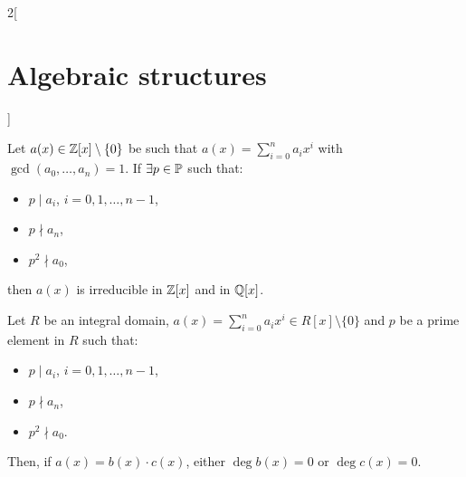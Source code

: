\documentclass[../../../main.tex]{subfiles}
\begin{document}
\begin{multicols}{2}[\section{Algebraic structures}]
\begin{theorem}
  \end{theorem}
  \begin{theorem}
    Let $a(x)\in\mathbb{Z}[x]\setminus\{0\}$ be such that $a(x)=\sum_{i=0}^na_ix^i$ with $\gcd(a_0,\ldots,a_n)=1$. If $\exists p\in\mathbb{P}$ such that:
    \begin{itemize}
      \item $p\mid a_i$, $i=0,1,\ldots,n-1$,
      \item $p\nmid a_n$,
      \item $p^2\nmid a_0$,
    \end{itemize}
    then $a(x)$ is irreducible in $\mathbb{Z}[x]$ and in $\mathbb{Q}[x]$.
  \end{theorem}
  \begin{theorem}
    Let $R$ be an integral domain, $a(x)=\sum_{i=0}^na_ix^i\in R[x]\setminus\{0\}$ and $p$ be a prime element in $R$ such that:
    \begin{itemize}
      \item $p\mid a_i$, $i=0,1,\ldots,n-1$,
      \item $p\nmid a_n$,
      \item $p^2\nmid a_0$.
    \end{itemize}
    Then, if $a(x)=b(x)\cdot c(x)$, either $\deg b(x)=0$ or $\deg c(x)=0$.
  \end{theorem}

\end{multicols}
\end{document}
